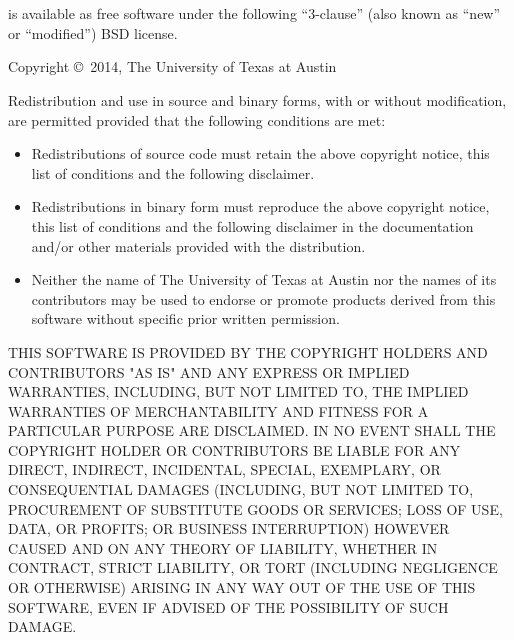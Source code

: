 
\section[BSD 3-clause license]{}

\smallskip

\libflame is available as free software under the following ``3-clause''
(also known as ``new'' or ``modified'') BSD license.

\bigskip

\noindent
Copyright \copyright\ 2014, The University of Texas at Austin

\bigskip

\noindent
Redistribution and use in source and binary forms, with or without
modification, are permitted provided that the following conditions are
met:
\begin{itemize}
\item
Redistributions of source code must retain the above copyright
notice, this list of conditions and the following disclaimer.
\item
Redistributions in binary form must reproduce the above copyright
notice, this list of conditions and the following disclaimer in the
documentation and/or other materials provided with the distribution.
\item
Neither the name of The University of Texas at Austin nor the names of its
contributors may be used to endorse or promote products derived
from this software without specific prior written permission.
\end{itemize}

\noindent
THIS SOFTWARE IS PROVIDED BY THE COPYRIGHT HOLDERS AND CONTRIBUTORS
"AS IS" AND ANY EXPRESS OR IMPLIED WARRANTIES, INCLUDING, BUT NOT
LIMITED TO, THE IMPLIED WARRANTIES OF MERCHANTABILITY AND FITNESS FOR
A PARTICULAR PURPOSE ARE DISCLAIMED. IN NO EVENT SHALL THE COPYRIGHT
HOLDER OR CONTRIBUTORS BE LIABLE FOR ANY DIRECT, INDIRECT, INCIDENTAL,
SPECIAL, EXEMPLARY, OR CONSEQUENTIAL DAMAGES (INCLUDING, BUT NOT
LIMITED TO, PROCUREMENT OF SUBSTITUTE GOODS OR SERVICES; LOSS OF USE,
DATA, OR PROFITS; OR BUSINESS INTERRUPTION) HOWEVER CAUSED AND ON ANY
THEORY OF LIABILITY, WHETHER IN CONTRACT, STRICT LIABILITY, OR TORT
(INCLUDING NEGLIGENCE OR OTHERWISE) ARISING IN ANY WAY OUT OF THE USE
OF THIS SOFTWARE, EVEN IF ADVISED OF THE POSSIBILITY OF SUCH DAMAGE.

